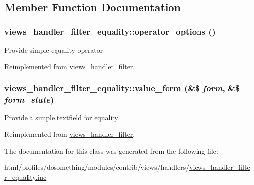 \subsection{Member Function Documentation}
\hypertarget{classviews__handler__filter__equality_a65280b952e08acb863768f6316dbeb33}{
\subsubsection[{operator\_\-options}]{\setlength{\rightskip}{0pt plus 5cm}views\_\-handler\_\-filter\_\-equality::operator\_\-options ()}}
\label{classviews__handler__filter__equality_a65280b952e08acb863768f6316dbeb33}
Provide simple equality operator 

Reimplemented from \hyperlink{classviews__handler__filter_acbd69b92e9199530a54069c79368db7f}{views\_\-handler\_\-filter}.\hypertarget{classviews__handler__filter__equality_a5ef4270bd7b8fae32e024f6ca6e7a6b8}{
\subsubsection[{value\_\-form}]{\setlength{\rightskip}{0pt plus 5cm}views\_\-handler\_\-filter\_\-equality::value\_\-form (\&\$ {\em form}, \/  \&\$ {\em form\_\-state})}}
\label{classviews__handler__filter__equality_a5ef4270bd7b8fae32e024f6ca6e7a6b8}
Provide a simple textfield for equality 

Reimplemented from \hyperlink{classviews__handler__filter_a9168b39edae84b20e01a3fd0d810ba66}{views\_\-handler\_\-filter}.

The documentation for this class was generated from the following file:\begin{DoxyCompactItemize}
\item 
html/profiles/dosomething/modules/contrib/views/handlers/\hyperlink{views__handler__filter__equality_8inc}{views\_\-handler\_\-filter\_\-equality.inc}\end{DoxyCompactItemize}
